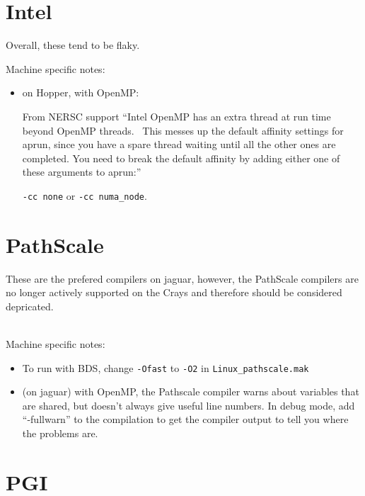 \section{Intel}

Overall, these tend to be flaky. 

Machine specific notes:

\begin{itemize}
\item on Hopper, with OpenMP:

From NERSC support ``Intel OpenMP has an extra thread at run time
beyond OpenMP threads.  This messes up the default affinity settings
for aprun, since you have a spare thread waiting until all the other
ones are completed.  You need to break the default affinity by adding
either one of these arguments to aprun:''

{\tt -cc none} or {\tt -cc numa\_node}.
\end{itemize}

\section{PathScale}

These are the prefered compilers on jaguar, however, the PathScale
compilers are no longer actively supported on the Crays and therefore
should be considered depricated. 


\ \\
Machine specific notes:
\begin{itemize}

\item  To run with BDS, change {\tt -Ofast} to {\tt -O2} in {\tt Linux\_pathscale.mak}

\item (on jaguar) with OpenMP, the Pathscale compiler warns about
  variables that are shared, but doesn't always give useful line
  numbers.  In debug mode, add ``-fullwarn'' to the compilation to get
  the compiler output to tell you where the problems are. 


\end{itemize}


\section{PGI}

